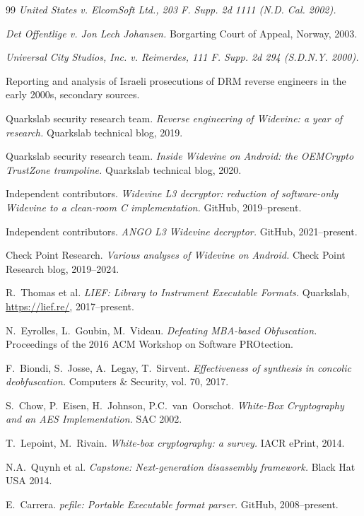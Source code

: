 \documentclass[11pt,letterpaper]{article}
\begin{document}
\begin{thebibliography}{99}
\textit{United States v. ElcomSoft Ltd., 203 F. Supp. 2d 1111 (N.D. Cal. 2002).}

\textit{Det Offentlige v. Jon Lech Johansen.}
Borgarting Court of Appeal, Norway, 2003.

\textit{Universal City Studios, Inc. v. Reimerdes, 111 F. Supp. 2d 294 (S.D.N.Y. 2000).}

Reporting and analysis of Israeli prosecutions of DRM reverse engineers
in the early 2000s, secondary sources.

Quarkslab security research team.
\textit{Reverse engineering of Widevine: a year of research.}
Quarkslab technical blog, 2019.

Quarkslab security research team.
\textit{Inside Widevine on Android: the OEMCrypto TrustZone trampoline.}
Quarkslab technical blog, 2020.

Independent contributors.
\textit{Widevine L3 decryptor: reduction of software-only Widevine to a clean-room C implementation.}
GitHub, 2019--present.

Independent contributors.
\textit{ANGO L3 Widevine decryptor.}
GitHub, 2021--present.

Check Point Research.
\textit{Various analyses of Widevine on Android.}
Check Point Research blog, 2019--2024.

R.~Thomas et al.
\textit{LIEF: Library to Instrument Executable Formats.}
Quarkslab, \url{https://lief.re/}, 2017--present.

N.~Eyrolles, L.~Goubin, M.~Videau.
\textit{Defeating MBA-based Obfuscation.}
Proceedings of the 2016 ACM Workshop on Software PROtection.

F.~Biondi, S.~Josse, A.~Legay, T.~Sirvent.
\textit{Effectiveness of synthesis in concolic deobfuscation.}
Computers \& Security, vol. 70, 2017.

S.~Chow, P.~Eisen, H.~Johnson, P.C.~van~Oorschot.
\textit{White-Box Cryptography and an AES Implementation.}
SAC 2002.

T.~Lepoint, M.~Rivain.
\textit{White-box cryptography: a survey.}
IACR ePrint, 2014.

N.A.~Quynh et al.
\textit{Capstone: Next-generation disassembly framework.}
Black Hat USA 2014.

E.~Carrera.
\textit{pefile: Portable Executable format parser.}
GitHub, 2008--present.

\end{thebibliography}
\end{document}
